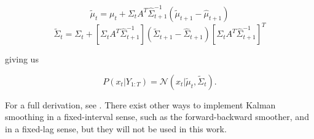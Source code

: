 \begin{equation}
\tilde{\mu}_t = \mu_{t} + \Sigma_t A^T \hat{\Sigma}_{t+1}^{-1} (\tilde{\mu}_{t+1} - \hat{\mu}_{t+1})
\label{eq:RTS_mean}
\end{equation}
\begin{equation}
\tilde{\Sigma}_t = \Sigma_{t} + [\Sigma_t A^T \hat{\Sigma}_{t+1}^{-1}] (\tilde{\Sigma}_{t+1} - \hat{\Sigma}_{t+1}) [\Sigma_t A^T \hat{\Sigma}_{t+1}^{-1}]^T
\label{eq:RTS_covar}
\end{equation}

giving us

\begin{equation}
P(x_t|Y_{1:T}) = \mathcal{N}(x_t|\tilde{\mu}_t, \tilde{\Sigma}_{t}).
\end{equation}

For a full derivation, see \cite{Rauch1965}. There exist other ways to implement Kalman smoothing in a fixed-interval sense, such as the forward-backward smoother, and in a fixed-lag sense, but they will not be used in this work.